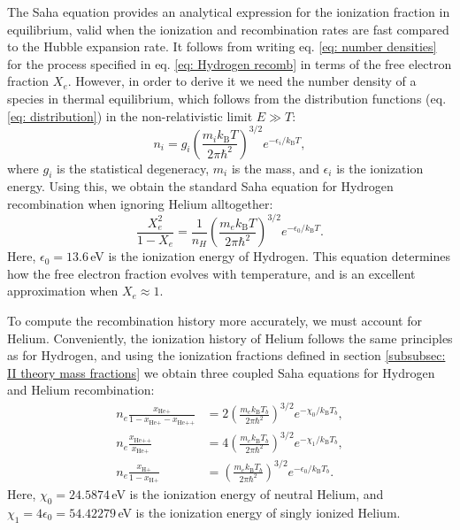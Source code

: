 \documentclass{aa}
\numberwithin{equation}{section}
\numberwithin{table}{section}
\numberwithin{figure}{section}
\begin{document}
The Saha equation provides an analytical expression for the ionization fraction in equilibrium, valid when the ionization and recombination rates are fast compared to the Hubble expansion rate. It follows from writing eq. \eqref{eq: number densities} for the process specified in eq. \eqref{eq: Hydrogen recomb} in terms of the free electron fraction $X_e$. However, in order to derive it we need the number density of a species in thermal equilibrium, which follows from the distribution functions (eq. \eqref{eq: distribution}) in the non-relativistic limit $E\gg T$:
\begin{equation}
n_i = g_i \left( \frac{m_i k_\text{B} T}{2\pi \hbar^2} \right)^{3/2} e^{-\epsilon_i / k_\text{B} T},
\end{equation}
where $g_i$ is the statistical degeneracy, $m_i$ is the mass, and $\epsilon_i$ is the ionization energy. Using this, we obtain the standard Saha equation for Hydrogen recombination when ignoring Helium alltogether:
\begin{equation}
\frac{X_e^2}{1 - X_e} = \frac{1}{n_H} \left( \frac{m_e k_\text{B} T}{2\pi \hbar^2} \right)^{3/2} e^{-\epsilon_0 / k_\text{B} T}. \label{eq: Saha}
\end{equation}
Here, $\epsilon_0 = 13.6\,$eV is the ionization energy of Hydrogen. This equation determines how the free electron fraction evolves with temperature, and is an excellent approximation when $X_e\approx1$.

To compute the recombination history more accurately, we must account for Helium. Conveniently, the ionization history of Helium follows the same principles as for Hydrogen,
and using the ionization fractions defined in section \ref{subsubsec: II theory mass fractions} we obtain three coupled Saha equations for Hydrogen and Helium recombination:
\begin{align}
n_e \frac{x_{\text{He+}}}{1 - x_{\text{He+}} - x_{\text{He++}}} &= 2 \left( \frac{m_e k_\text{B}T_b}{2\pi\hbar^2} \right)^{3/2} e^{-\chi_0 / k_\text{B}T_b}, \\
n_e \frac{x_{\text{He++}}}{x_{\text{He+}}} &= 4 \left( \frac{m_e k_\text{B}T_b}{2\pi\hbar^2} \right)^{3/2} e^{-\chi_1 / k_\text{B}T_b}, \\
n_e \frac{x_{\text{H+}}}{1 - x_{\text{H+}}} &= \left( \frac{m_e k_\text{B}T_b}{2\pi\hbar^2} \right)^{3/2} e^{-\epsilon_0 / k_\text{B}T_b}.
\end{align}
Here, $\chi_0 = 24.5874\,$eV is the ionization energy of neutral Helium, and $\chi_1 = 4\epsilon_0 = 54.42279\,$eV is the ionization energy of singly ionized Helium.
\end{document}
